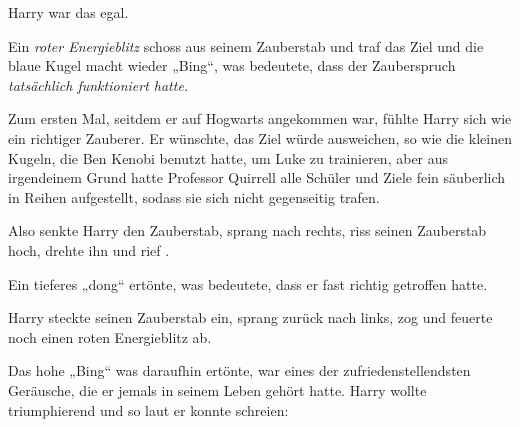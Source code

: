 Harry war das egal.


Ein \emph{roter Energieblitz} schoss aus seinem Zauberstab und traf das Ziel und die blaue Kugel macht wieder
„Bing“, was bedeutete, dass der Zauberspruch \emph{tatsächlich funktioniert hatte.}

Zum ersten Mal, seitdem er auf Hogwarts angekommen war, fühlte Harry sich wie ein richtiger Zauberer. Er wünschte, das Ziel würde ausweichen, so wie die kleinen Kugeln, die Ben Kenobi benutzt hatte, um Luke zu trainieren, aber aus irgendeinem Grund hatte Professor Quirrell alle Schüler und Ziele fein säuberlich in Reihen aufgestellt, sodass sie sich nicht gegenseitig trafen.

Also senkte Harry den Zauberstab, sprang nach rechts, riss seinen Zauberstab hoch, drehte ihn und rief .

Ein tieferes „dong“ ertönte, was bedeutete, dass er fast richtig getroffen hatte.

Harry steckte seinen Zauberstab ein, sprang zurück nach links, zog und feuerte noch einen roten Energieblitz ab.

Das hohe
„Bing“ was daraufhin ertönte, war eines der zufriedenstellendsten Geräusche, die er jemals in seinem Leben gehört hatte. Harry wollte triumphierend und so laut er konnte schreien: \emph{}

